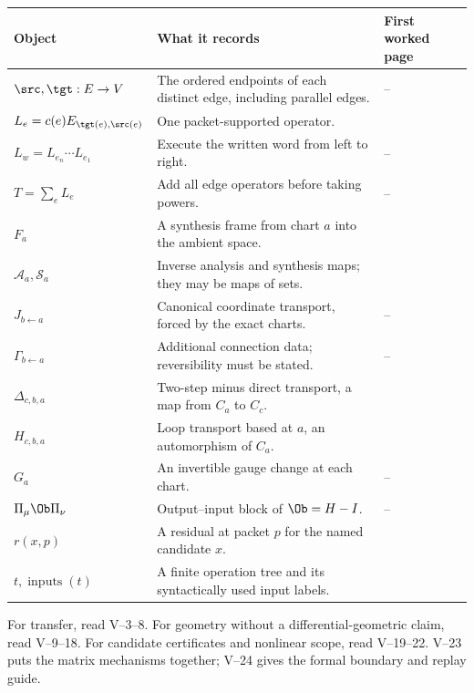{\small
\begin{tabularx}{\linewidth}{@{}p{.27\linewidth}Yp{.20\linewidth}@{}}\toprule
\textbf{Object} & \textbf{What it records} & \textbf{First worked page}\\\midrule
$\src,\tgt:E\to V$ & The ordered endpoints of each distinct edge, including parallel edges. & --\\
$L_e=c(e)E_{\tgt(e),\src(e)}$ & One packet-supported operator. & \\
$L_w=L_{e_n}\cdots L_{e_1}$ & Execute the written word from left to right. & --\\
$T=\sum_eL_e$ & Add all edge operators before taking powers. & --\\
$F_a$ & A synthesis frame from chart $a$ into the ambient space. & \\
$\mathcal A_a,\mathcal S_a$ & Inverse analysis and synthesis maps; they may be maps of sets. & \\
$J_{b\leftarrow a}$ & Canonical coordinate transport, forced by the exact charts. & --\\
$\Gamma_{b\leftarrow a}$ & Additional connection data; reversibility must be stated. & --\\
$\Delta_{c,b,a}$ & Two-step minus direct transport, a map from $C_a$ to $C_c$. & \\
$H_{c,b,a}$ & Loop transport based at $a$, an automorphism of $C_a$. & \\
$G_a$ & An invertible gauge change at each chart. & --\\
$\Pi_\mu\Ob\Pi_\nu$ & Output--input block of $\Ob=H-I$. & --\\
$r(x,p)$ & A residual at packet $p$ for the named candidate $x$. & \\
$t,\operatorname{inputs}(t)$ & A finite operation tree and its syntactically used input labels. & \\\bottomrule
\end{tabularx}}

For transfer, read V--3--8. For geometry without a differential-geometric claim, read V--9--18. For candidate certificates and nonlinear scope, read V--19--22. V--23 puts the matrix mechanisms together; V--24 gives the formal boundary and replay guide.

